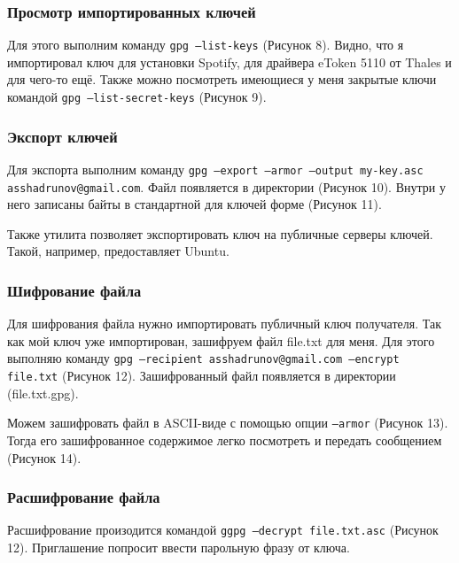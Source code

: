 \FloatBarrier
\clearpage


\subsubsection{Просмотр импортированных ключей}
Для этого выполним команду \texttt{gpg --list-keys} (Рисунок 8). Видно, что я импортировал ключ для установки Spotify, для драйвера eToken 5110 от Thales и для чего-то ещё. Также можно посмотреть имеющиеся у меня закрытые ключи командой \texttt{gpg --list-secret-keys} (Рисунок 9).

\FloatBarrier
\clearpage


\subsubsection{Экспорт ключей}
Для экспорта выполним команду \texttt{gpg --export --armor --output my-key.asc asshadrunov@gmail.com}. Файл появляется в директории (Рисунок 10). Внутри у него записаны байты в стандартной для ключей форме (Рисунок 11). 

\FloatBarrier

Также утилита позволяет экспортировать ключ на публичные серверы ключей. Такой, например, предоставляет Ubuntu.
\clearpage


\subsubsection{Шифрование файла}
Для шифрования файла нужно импортировать публичный ключ получателя. Так как мой ключ уже импортирован, зашифруем файл file.txt для меня. Для этого выполняю команду \texttt{gpg --recipient asshadrunov@gmail.com --encrypt file.txt} (Рисунок 12). Зашифрованный файл появляется в директории (file.txt.gpg). 

\FloatBarrier

Можем зашифровать файл в ASCII-виде с помощью опции \texttt{--armor} (Рисунок 13). Тогда его зашифрованное содержимое легко посмотреть и передать сообщением (Рисунок 14). 

\FloatBarrier
\clearpage


\subsubsection{Расшифрование файла}
Расшифрование произодится командой \texttt{ggpg --decrypt file.txt.asc} (Рисунок 12). Приглашение попросит ввести парольную фразу от ключа.

